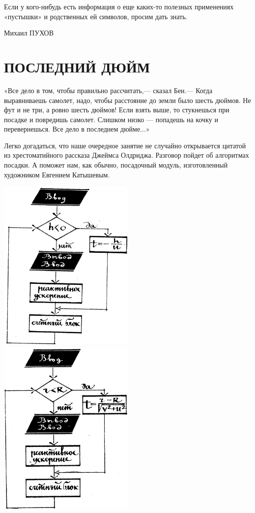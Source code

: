 \documentclass[11pt,a4paper,oneside]{article}
\begin{document}
Если у кого-нибудь есть информация о еще каких-то полезных применениях «пустышки» и родственных ей символов, просим дать знать.

Михаил ПУХОВ

\section{ПОСЛЕДНИЙ ДЮЙМ}
«Все дело в том, чтобы правильно рассчитать,— сказал Бен.— Когда выравниваешь самолет, надо, чтобы расстояние до земли было шесть дюймов. Не фут и не три, а ровно шесть дюймов! Если взять выше, то стукнешься при посадке и повредишь самолет. Слишком низко — попадешь на кочку и перевернешься. Все дело в последнем дюйме...»

Легко догадаться, что наше очередное занятие не случайно открывается цитатой из хрестоматийного рассказа Джеймса Олдриджа. Разговор пойдет об алгоритмах посадки. А поможет нам, как обычно, посадочный модуль, изготовленный художником Евгением Катышевым.

\includegraphics[width=0.5\textwidth]{last_d1}
\includegraphics[width=0.5\textwidth]{last_d4}
\end{document}
